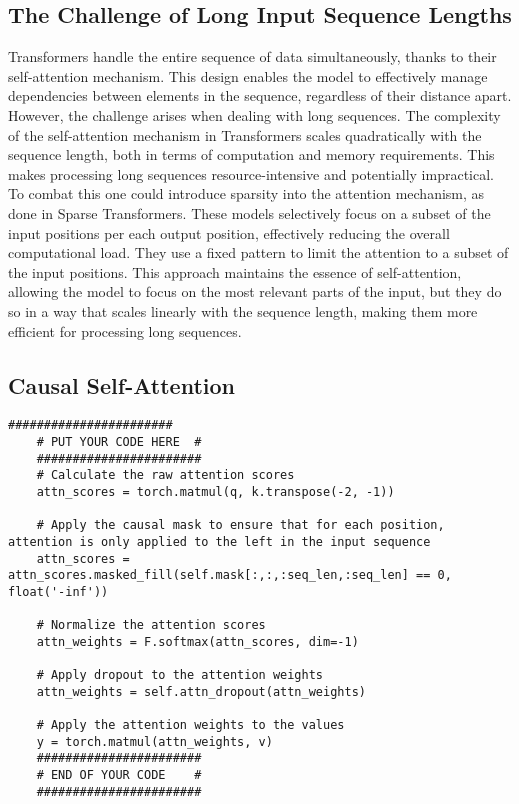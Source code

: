 \documentclass[a4paper]{article}
\begin{document}
\subsection{The Challenge of Long Input Sequence Lengths}
Transformers handle the entire sequence of data simultaneously, thanks to their self-attention mechanism. This design enables
the model to effectively manage dependencies between elements in the sequence, regardless of their distance apart. However,
the challenge arises when dealing with long sequences. The complexity of the self-attention mechanism in Transformers scales
quadratically with the sequence length, both in terms of computation and memory requirements. This makes processing long
sequences resource-intensive and potentially impractical.
To combat this one could introduce sparsity into the attention mechanism, as done in Sparse Transformers. These models
selectively focus on a subset of the input positions per each output position, effectively reducing the overall computational
load. They use a fixed pattern to limit the attention to a subset of the input positions. This approach maintains the essence
of self-attention, allowing the model to focus on the most relevant parts of the input, but they do so in a way that scales
linearly with the sequence length, making them more efficient for processing long sequences.

\subsection{Causal Self-Attention}
\begin{lstlisting}[caption={Causal Self-Attention Forward}, label=lst:causal-self-attention]
    #######################
    # PUT YOUR CODE HERE  #
    #######################
    # Calculate the raw attention scores
    attn_scores = torch.matmul(q, k.transpose(-2, -1))
    
    # Apply the causal mask to ensure that for each position, attention is only applied to the left in the input sequence
    attn_scores = attn_scores.masked_fill(self.mask[:,:,:seq_len,:seq_len] == 0, float('-inf'))
    
    # Normalize the attention scores
    attn_weights = F.softmax(attn_scores, dim=-1)
    
    # Apply dropout to the attention weights
    attn_weights = self.attn_dropout(attn_weights)
    
    # Apply the attention weights to the values
    y = torch.matmul(attn_weights, v)
    #######################
    # END OF YOUR CODE    #
    #######################
\end{lstlisting}
\end{document}
